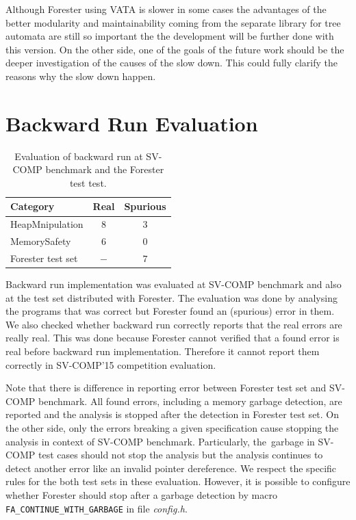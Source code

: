 Although Forester using VATA is slower in some cases
the advantages of the better modularity
and maintainability coming from the separate library
for tree automata are still so important
the the development will be further done with this version.
On the other side, one of the goals of the future work should be
the deeper investigation of the causes of the slow down.
This could fully clarify the reasons why the slow down happen.


\section{Backward Run Evaluation}
\label{sec:bweval}

\begin{table}[bt]
	\vskip6pt
	\caption{Evaluation of backward run at SV-COMP benchmark
		and the Forester test test.
	}
	\centering
	\begin{tabular}{lcc}
		\toprule
		Category & Real & Spurious \\
		\midrule
		HeapMnipulation & $8$ & $3$ \\
		MemorySafety & $6$ & $0$ \\
		Forester test set & $-$ & $7$ \\
		\bottomrule
	\end{tabular}
	\label{tab:bwres}
\end{table}

Backward run implementation was evaluated at SV-COMP benchmark
and also at the test set distributed with Forester.
The evaluation was done by analysing the programs that was correct
but Forester found an (spurious) error in them.
We also checked whether backward run correctly
reports that the real errors are really real.
This was done because Forester cannot verified
that a found error is real before backward run implementation.
Therefore it cannot report them correctly in SV-COMP'15 competition
evaluation.

Note that there is difference in reporting error between
Forester test set and SV-COMP benchmark.
All found errors, including a memory garbage detection, are reported
and the analysis is stopped after the detection in Forester test set.
On the other side, only the errors breaking a given specification
cause stopping the analysis in context of SV-COMP benchmark.
Particularly, the~garbage in SV-COMP test cases should not
stop the analysis but the analysis continues to
detect another error like an invalid pointer dereference.
We respect the specific rules for the both test sets in these evaluation.
However, it is possible to configure whether
Forester should stop after a garbage detection by
macro {\tt FA\_CONTINUE\_WITH\_GARBAGE} in file \emph{config.h}.

